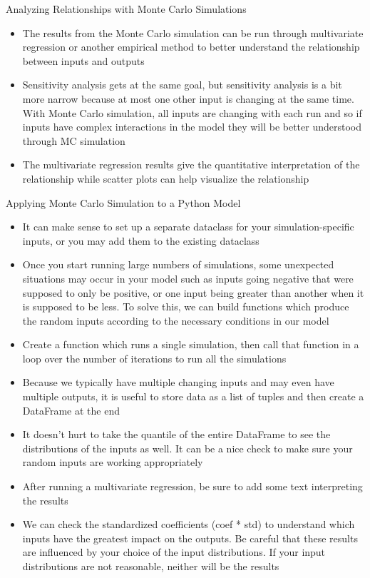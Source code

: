 \documentclass[]{article}
\begin{document}
\begin{section}{Analyzing Relationships with Monte Carlo Simulations}
\begin{itemize}
\item The results from the Monte Carlo simulation can be run through multivariate regression or another empirical method to better understand the relationship between inputs and outputs
\item Sensitivity analysis gets at the same goal, but sensitivity analysis is a bit more narrow because at most one other input is changing at the same time. With Monte Carlo simulation, all inputs are changing with each run and so if inputs have complex interactions in the model they will be better understood through MC simulation
\item The multivariate regression results give the quantitative interpretation of the relationship while scatter plots can help visualize the relationship
\end{itemize}
\end{section}
\begin{section}{Applying Monte Carlo Simulation to a Python Model}
\begin{itemize}
\item It can make sense to set up a separate dataclass for your simulation-specific inputs, or you may add them to the existing dataclass
\item Once you start running large numbers of simulations, some unexpected situations may occur in your model such as inputs going negative that were supposed to only be positive, or one input being greater than another when it is supposed to be less. To solve this, we can build functions which produce the random inputs according to the necessary conditions in our model
\item Create a function which runs a single simulation, then call that function in a loop over the number of iterations to run all the simulations
\item Because we typically have multiple changing inputs and may even have multiple outputs, it is useful to store data as a list of tuples and then create a DataFrame at the end
\item It doesn't hurt to take the quantile of the entire DataFrame to see the distributions of the inputs as well. It can be a nice check to make sure your random inputs are working appropriately
\item After running a multivariate regression, be sure to add some text interpreting the results
\item We can check the standardized coefficients (coef * std) to understand which inputs have the greatest impact on the outputs. Be careful that these results are influenced by your choice of the input distributions. If your input distributions are not reasonable, neither will be the results
\end{itemize}
\end{section}
\end{document}
